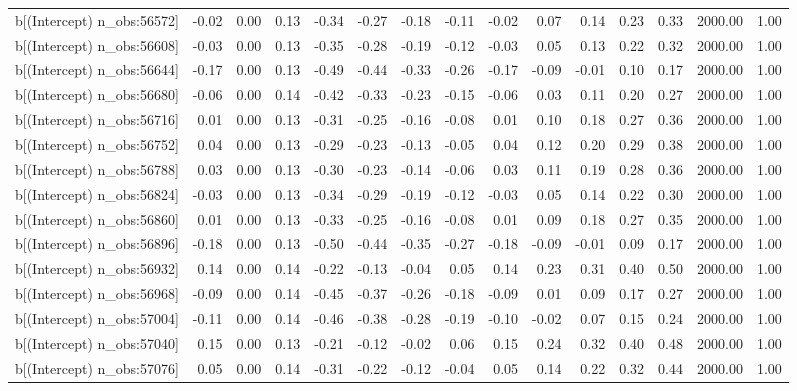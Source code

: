 \begin{table}[ht]
\begin{tabular}{rrrrrrrrrrrrrrr}
  b[(Intercept) n\_obs:56572] & -0.02 & 0.00 & 0.13 & -0.34 & -0.27 & -0.18 & -0.11 & -0.02 & 0.07 & 0.14 & 0.23 & 0.33 & 2000.00 & 1.00 \\ 
  b[(Intercept) n\_obs:56608] & -0.03 & 0.00 & 0.13 & -0.35 & -0.28 & -0.19 & -0.12 & -0.03 & 0.05 & 0.13 & 0.22 & 0.32 & 2000.00 & 1.00 \\ 
  b[(Intercept) n\_obs:56644] & -0.17 & 0.00 & 0.13 & -0.49 & -0.44 & -0.33 & -0.26 & -0.17 & -0.09 & -0.01 & 0.10 & 0.17 & 2000.00 & 1.00 \\ 
  b[(Intercept) n\_obs:56680] & -0.06 & 0.00 & 0.14 & -0.42 & -0.33 & -0.23 & -0.15 & -0.06 & 0.03 & 0.11 & 0.20 & 0.27 & 2000.00 & 1.00 \\ 
  b[(Intercept) n\_obs:56716] & 0.01 & 0.00 & 0.13 & -0.31 & -0.25 & -0.16 & -0.08 & 0.01 & 0.10 & 0.18 & 0.27 & 0.36 & 2000.00 & 1.00 \\ 
  b[(Intercept) n\_obs:56752] & 0.04 & 0.00 & 0.13 & -0.29 & -0.23 & -0.13 & -0.05 & 0.04 & 0.12 & 0.20 & 0.29 & 0.38 & 2000.00 & 1.00 \\ 
  b[(Intercept) n\_obs:56788] & 0.03 & 0.00 & 0.13 & -0.30 & -0.23 & -0.14 & -0.06 & 0.03 & 0.11 & 0.19 & 0.28 & 0.36 & 2000.00 & 1.00 \\ 
  b[(Intercept) n\_obs:56824] & -0.03 & 0.00 & 0.13 & -0.34 & -0.29 & -0.19 & -0.12 & -0.03 & 0.05 & 0.14 & 0.22 & 0.30 & 2000.00 & 1.00 \\ 
  b[(Intercept) n\_obs:56860] & 0.01 & 0.00 & 0.13 & -0.33 & -0.25 & -0.16 & -0.08 & 0.01 & 0.09 & 0.18 & 0.27 & 0.35 & 2000.00 & 1.00 \\ 
  b[(Intercept) n\_obs:56896] & -0.18 & 0.00 & 0.13 & -0.50 & -0.44 & -0.35 & -0.27 & -0.18 & -0.09 & -0.01 & 0.09 & 0.17 & 2000.00 & 1.00 \\ 
  b[(Intercept) n\_obs:56932] & 0.14 & 0.00 & 0.14 & -0.22 & -0.13 & -0.04 & 0.05 & 0.14 & 0.23 & 0.31 & 0.40 & 0.50 & 2000.00 & 1.00 \\ 
  b[(Intercept) n\_obs:56968] & -0.09 & 0.00 & 0.14 & -0.45 & -0.37 & -0.26 & -0.18 & -0.09 & 0.01 & 0.09 & 0.17 & 0.27 & 2000.00 & 1.00 \\ 
  b[(Intercept) n\_obs:57004] & -0.11 & 0.00 & 0.14 & -0.46 & -0.38 & -0.28 & -0.19 & -0.10 & -0.02 & 0.07 & 0.15 & 0.24 & 2000.00 & 1.00 \\ 
  b[(Intercept) n\_obs:57040] & 0.15 & 0.00 & 0.13 & -0.21 & -0.12 & -0.02 & 0.06 & 0.15 & 0.24 & 0.32 & 0.40 & 0.48 & 2000.00 & 1.00 \\ 
  b[(Intercept) n\_obs:57076] & 0.05 & 0.00 & 0.14 & -0.31 & -0.22 & -0.12 & -0.04 & 0.05 & 0.14 & 0.22 & 0.32 & 0.44 & 2000.00 & 1.00 \\ 

\end{tabular}
\end{table}
